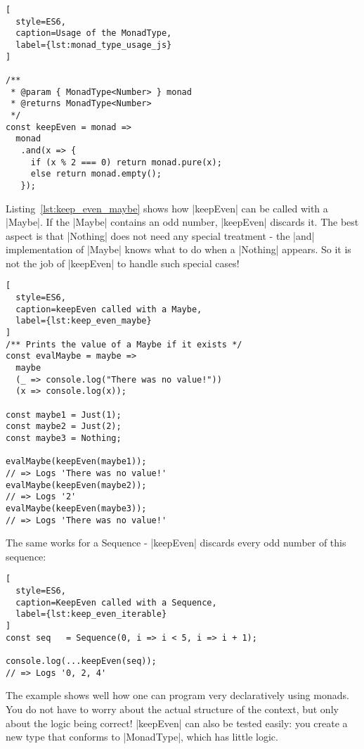 \begin{lstlisting}[
  style=ES6,
  caption=Usage of the MonadType,
  label={lst:monad_type_usage_js}
]

/**
 * @param { MonadType<Number> } monad
 * @returns MonadType<Number>
 */
const keepEven = monad => 
  monad
   .and(x => {
     if (x % 2 === 0) return monad.pure(x);
     else return monad.empty();
   }); 
\end{lstlisting}

Listing~\ref{lst:keep_even_maybe} shows how |keepEven| can be called with a
|Maybe|. If the |Maybe| contains an odd number, |keepEven| discards it. The
best aspect is that |Nothing| does not need any special treatment - the
|and| implementation of |Maybe| knows what to do when a |Nothing| appears. So
it is not the job of |keepEven| to handle such special cases!

\begin{lstlisting}[
  style=ES6,
  caption=keepEven called with a Maybe,
  label={lst:keep_even_maybe}
]
/** Prints the value of a Maybe if it exists */
const evalMaybe = maybe =>
  maybe
  (_ => console.log("There was no value!"))
  (x => console.log(x));

const maybe1 = Just(1);
const maybe2 = Just(2);
const maybe3 = Nothing;

evalMaybe(keepEven(maybe1));
// => Logs 'There was no value!'
evalMaybe(keepEven(maybe2));
// => Logs '2'
evalMaybe(keepEven(maybe3));
// => Logs 'There was no value!'
\end{lstlisting}

The same works for a Sequence - |keepEven| discards every odd number of this
sequence:

\begin{lstlisting}[
  style=ES6,
  caption=KeepEven called with a Sequence,
  label={lst:keep_even_iterable}
]
const seq   = Sequence(0, i => i < 5, i => i + 1);

console.log(...keepEven(seq));
// => Logs '0, 2, 4'
\end{lstlisting}
The example shows well how one can program very declaratively using monads. You
do not have to worry about the actual structure of the context, but only about
the logic being correct!
|keepEven| can also be tested easily: you create a new type that conforms to
|MonadType|, which has little logic.

